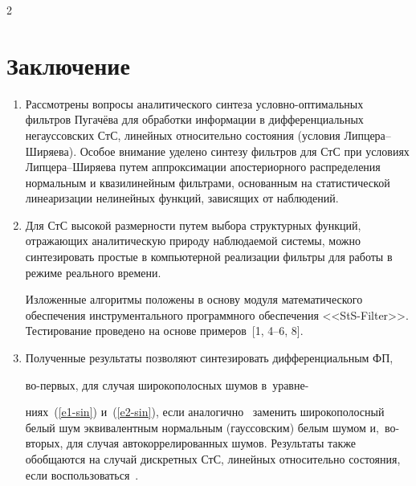 \begin{multicols}{2}
    \vspace*{-18pt}





\section{Заключение}



\vspace*{-4pt}



\noindent

\begin{enumerate}[1.]

\item Рассмотрены вопросы аналитического синтеза услов\-но-оп\-ти\-маль\-ных фильтров Пугачёва для обработки информации в дифференциальных негауссовских СтС, линейных относитель\-но состояния (условия Лип\-це\-ра--Ши\-ря\-ева). Особое внимание уделено синтезу фильт\-ров для СтС при условиях Лип\-це\-ра--Ши\-ря\-ева путем аппроксимации апостериорного распределения нормальным и квазилинейным фильт\-ра\-ми, основанным на статистической линеаризации нелинейных функций, зависящих от наблюдений.



\item Для СтС высокой размерности путем выбора структурных функций, отражающих аналитическую природу наблюдаемой системы, можно синтезировать простые в компьютерной реализации фильтры для работы в режиме реального времени.



Изложенные алгоритмы положены в основу модуля математического обеспечения инструментального программного обеспечения <<StS-Filter>>. Тестирование проведено на основе примеров~[1, 4--6, 8].



\item Полученные результаты  позволяют синтезировать дифференциальным ФП,

 во-пер\-вых, для случая широкополосных шумов в~уравне-\linebreak\vspace*{-12pt}



 \pagebreak



 \noindent

 ниях~(\ref{e1-sin}) и~(\ref{e2-sin}), если аналогично~\cite{3-sin} заменить широкополосный белый шум эквивалентным нормальным (гауссовским) белым шумом и,~во-вто\-рых, для случая автокоррелированных шумов. Результаты также обобщаются на случай дискретных СтС, линейных относительно состояния, если воспользоваться~\cite{4-sin}.


\end{enumerate}
\end{multicols}
